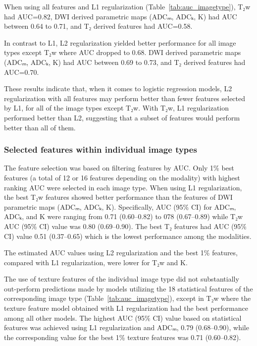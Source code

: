 When using all features and L1 regularization (Table~\ref{tab:auc_imagetype}),
T₂w had AUC=0.82, DWI derived parametric maps (ADCₘ, ADCₖ, K) had AUC between
0.64 to 0.71, and T₂ derived features had AUC=0.58.

In contrast to L1, L2 regularization yielded better performance for all image
types except T₂w where AUC dropped to 0.68. DWI derived parametric maps (ADCₘ,
ADCₖ, K) had AUC between 0.69 to 0.73, and T₂ derived features had AUC=0.70.

These results indicate that, when it comes to logistic regression models, L2
regularization with all features may perform better than fewer features
selected by L1, for all of the image types except T₂w. With T₂w,
L1 regularization performed better than L2, suggesting that a subset of
features would perform better than all of them.


\subsubsection{Selected features within individual image types}

The feature selection was based on filtering features by AUC\@. Only 1\% best
features (a total of 12 or 16 features depending on the modality) with highest
ranking AUC were selected in each image type. When using L1 regularization, the
best T₂w features showed better performance than the features of DWI
parametric maps (ADCₘ, ADCₖ, K). Specifically, AUC (95\% CI) for ADCₘ, ADCₖ,
and K were ranging from 0.71 (0.60--0.82) to 078 (0.67--0.89) while T₂w AUC
(95\% CI) value was 0.80 (0.69--0.90). The best T₂ features had AUC (95\% CI)
value 0.51 (0.37--0.65) which is the lowest performance among the modalities.

The estimated AUC values using L2 regularization and the best 1\% features,
compared with L1 regularization, were lower for T₂w and K.

The use of texture features of the individual image type did not substantially
out-perform predictions made by models utilizing the 18 statistical features of
the corresponding image type (Table~\ref{tab:auc_imagetype}), except in T₂w
where the texture feature model obtained with L1 regularization had the best
performance among all other models. The highest AUC (95\% CI) value based on
statistical features was achieved using L1 regularization and ADCₘ, 0.79
(0.68--0.90), while the corresponding value for the best 1\% texture features
was 0.71 (0.60--0.82).

